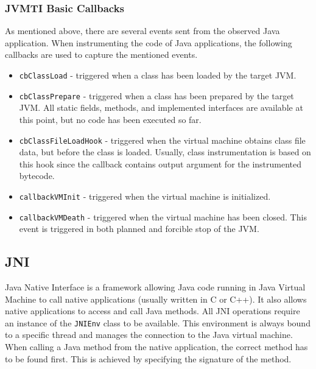 \subsubsection{JVMTI Basic Callbacks}
As mentioned above, there are several events sent from the observed Java application. When instrumenting the code of Java applications, the following callbacks are used to capture the mentioned events.
\begin{itemize}
	\item \texttt{cbClassLoad} - triggered when a class has been loaded by the target JVM.
	\item \texttt{cbClassPrepare} - triggered when a class has been prepared by the target JVM. All static fields, methods, and implemented interfaces are available at this point, but no code has been executed so far.
	\item \texttt{cbClassFileLoadHook} - triggered when the virtual machine obtains class file data, but before the class is loaded. Usually, class instrumentation is based on this hook since the callback contains output argument for the instrumented bytecode.
	\item  \texttt{callbackVMInit} - triggered when the virtual machine is initialized.
	\item  \texttt{callbackVMDeath} - triggered when the virtual machine has been closed. This event is triggered in both planned and forcible stop of the JVM.
\end{itemize}

\subsection{JNI}
\label{JNI}
Java Native Interface is a framework allowing Java code running in Java Virtual Machine to call native applications (usually written in C or C++). It also allows native applications to access and call Java methods. All JNI operations require an instance of the \texttt{JNIEnv} class to be available. This environment is always bound to a specific thread and manages the connection to the Java virtual machine. When calling a Java method from the native application, the correct method has to be found first. This is achieved by specifying the signature of the method.
